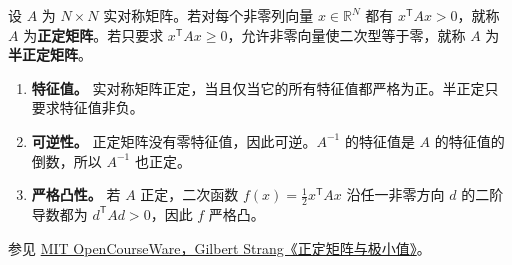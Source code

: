 \begin{tcolorbox}[knowledge,title=正定矩阵的定义与性质]
\hypertarget{wj-positive-definite}{}设 $A$ 为 $N\times N$ 实对称矩阵。若对每个非零列向量 $x\in\mathbb R^N$ 都有 $x^{\mathsf T}Ax>0$，就称 $A$ 为\textbf{正定矩阵}。若只要求 $x^{\mathsf T}Ax\ge 0$，允许非零向量使二次型等于零，就称 $A$ 为\textbf{半正定矩阵}。

\begin{enumerate}
 \item \textbf{特征值。} 实对称矩阵正定，当且仅当它的所有特征值都严格为正。半正定只要求特征值非负。
 \item \textbf{可逆性。} 正定矩阵没有零特征值，因此可逆。$A^{-1}$ 的特征值是 $A$ 的特征值的倒数，所以 $A^{-1}$ 也正定。
 \item \textbf{严格凸性。} 若 $A$ 正定，二次函数 $f(x)=\tfrac12x^{\mathsf T}Ax$ 沿任一非零方向 $d$ 的二阶导数都为 $d^{\mathsf T}Ad>0$，因此 $f$ 严格凸。
\end{enumerate}
参见 \href{https://ocw.mit.edu/courses/18-06sc-linear-algebra-fall-2011/pages/positive-definite-matrices-and-applications/positive-definite-matrices-and-minima/}{MIT OpenCourseWare，Gilbert Strang《正定矩阵与极小值》}。
\end{tcolorbox}

